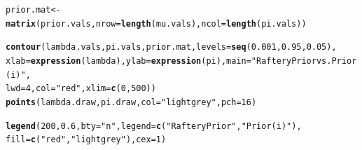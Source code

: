 \documentclass[12pt]{article}\usepackage[]{graphicx}\usepackage[]{color}
\makeatletter
\newcommand{\hlnum}[1]{\textcolor[rgb]{0.686,0.059,0.569}{#1}}%
\newcommand{\hlstr}[1]{\textcolor[rgb]{0.192,0.494,0.8}{#1}}%
\newcommand{\hlstd}[1]{\textcolor[rgb]{0.345,0.345,0.345}{#1}}%
\newcommand{\hlkwb}[1]{\textcolor[rgb]{0.69,0.353,0.396}{#1}}%
\newcommand{\hlkwc}[1]{\textcolor[rgb]{0.333,0.667,0.333}{#1}}%
\newcommand{\hlkwd}[1]{\textcolor[rgb]{0.737,0.353,0.396}{\textbf{#1}}}%
\newenvironment{kframe}{%
 \def\at@end@of@kframe{}%
 \ifinner\ifhmode%
  \def\at@end@of@kframe{\end{minipage}}%
  \begin{minipage}{\columnwidth}%
 \fi\fi%
 \def\FrameCommand##1{\hskip\@totalleftmargin \hskip-\fboxsep
 \colorbox{shadecolor}{##1}\hskip-\fboxsep
     \hskip-\linewidth \hskip-\@totalleftmargin \hskip\columnwidth}%
 \MakeFramed {\advance\hsize-\width
   \@totalleftmargin\z@ \linewidth\hsize
   \@setminipage}}%
 {\par\unskip\endMakeFramed%
 \at@end@of@kframe}
\newenvironment{knitrout}{}{} %
\makeatother
\begin{document}
\begin{knitrout}
\begin{kframe}
\begin{alltt}
\hlstd{prior.mat} \hlkwb{<-} \hlkwd{matrix}\hlstd{(prior.vals,} \hlkwc{nrow}\hlstd{=}\hlkwd{length}\hlstd{(mu.vals),} \hlkwc{ncol}\hlstd{=}\hlkwd{length}\hlstd{(pi.vals))}

\hlkwd{contour}\hlstd{(lambda.vals, pi.vals, prior.mat,} \hlkwc{levels}\hlstd{=}\hlkwd{seq}\hlstd{(}\hlnum{0.001}\hlstd{,} \hlnum{0.95}\hlstd{,} \hlnum{0.05}\hlstd{),}
        \hlkwc{xlab}\hlstd{=}\hlkwd{expression}\hlstd{(lambda),} \hlkwc{ylab}\hlstd{=}\hlkwd{expression}\hlstd{(pi),} \hlkwc{main}\hlstd{=}\hlstr{"Raftery Prior vs. Prior (i)"}\hlstd{,}
        \hlkwc{lwd}\hlstd{=}\hlnum{4}\hlstd{,} \hlkwc{col}\hlstd{=}\hlstr{"red"}\hlstd{,} \hlkwc{xlim} \hlstd{=} \hlkwd{c}\hlstd{(}\hlnum{0}\hlstd{,} \hlnum{500}\hlstd{))}
\hlkwd{points}\hlstd{(lambda.draw, pi.draw,} \hlkwc{col}\hlstd{=}\hlstr{"lightgrey"}\hlstd{,} \hlkwc{pch}\hlstd{=}\hlnum{16}\hlstd{)}

\hlkwd{legend}\hlstd{(}\hlnum{200}\hlstd{,} \hlnum{0.6}\hlstd{,} \hlkwc{bty}\hlstd{=}\hlstr{"n"}\hlstd{,} \hlkwc{legend}\hlstd{=}\hlkwd{c}\hlstd{(}\hlstr{"Raftery Prior"}\hlstd{,} \hlstr{"Prior (i)"}\hlstd{),}
       \hlkwc{fill}\hlstd{=}\hlkwd{c}\hlstd{(}\hlstr{"red"}\hlstd{,} \hlstr{"lightgrey"}\hlstd{),} \hlkwc{cex}\hlstd{=}\hlnum{1}\hlstd{)}
\end{alltt}
\end{kframe}
\end{knitrout}
\end{document}
